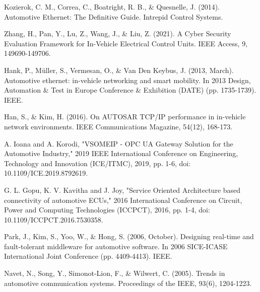 \documentclass[a4paper, 12pt, oneside, BCOR1cm,toc=chapterentrywithdots]{scrbook}
\begin{document}


%
%

\def\BibTeX{{\rm B\kern-.05em{\sc i\kern-.025em b}\kern-.08em
    T\kern-.1667em\lower.7ex\hbox{E}\kern-.125emX}}
\printindex

\begin{thebibliography}{00}
Kozierok, C. M., Correa, C., Boatright, R. B., \& Quesnelle, J. (2014). Automotive Ethernet: The Definitive Guide. Intrepid Control Systems.

Zhang, H., Pan, Y., Lu, Z., Wang, J., \& Liu, Z. (2021). A Cyber Security Evaluation Framework for In-Vehicle Electrical Control Units. IEEE Access, 9, 149690-149706.

Hank, P., Müller, S., Vermesan, O., \& Van Den Keybus, J. (2013, March). Automotive ethernet: in-vehicle networking and smart mobility. In 2013 Design, Automation \& Test in Europe Conference \& Exhibition (DATE) (pp. 1735-1739). IEEE.

Han, S., \& Kim, H. (2016). On AUTOSAR TCP/IP performance in in-vehicle network environments. IEEE Communications Magazine, 54(12), 168-173.

A. Ioana and A. Korodi, "VSOMEIP - OPC UA Gateway Solution for the Automotive Industry," 2019 IEEE International Conference on Engineering, Technology and Innovation (ICE/ITMC), 2019, pp. 1-6, doi: 10.1109/ICE.2019.8792619.

G. L. Gopu, K. V. Kavitha and J. Joy, "Service Oriented Architecture based connectivity of automotive ECUs," 2016 International Conference on Circuit, Power and Computing Technologies (ICCPCT), 2016, pp. 1-4, doi: 10.1109/ICCPCT.2016.7530358.

Park, J., Kim, S., Yoo, W., \& Hong, S. (2006, October). Designing real-time and fault-tolerant middleware for automotive software. In 2006 SICE-ICASE International Joint Conference (pp. 4409-4413). IEEE.

Navet, N., Song, Y., Simonot-Lion, F., \& Wilwert, C. (2005). Trends in automotive communication systems. Proceedings of the IEEE, 93(6), 1204-1223.


\end{thebibliography}
\end{document}
